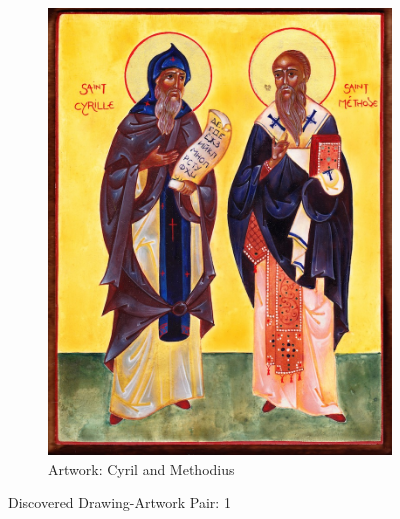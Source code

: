 \begin{figure}
\begin{subfigure}[b]{0.45\textwidth}
         \includegraphics[width=\textwidth]{images/new_discoveries/cyrille-et-methode.jpg}
         \caption{Artwork: Cyril and Methodius}
         \label{fig:cyrille-et-methode}
     \end{subfigure}
     \caption{Discovered Drawing-Artwork Pair: 1}
\end{figure}

